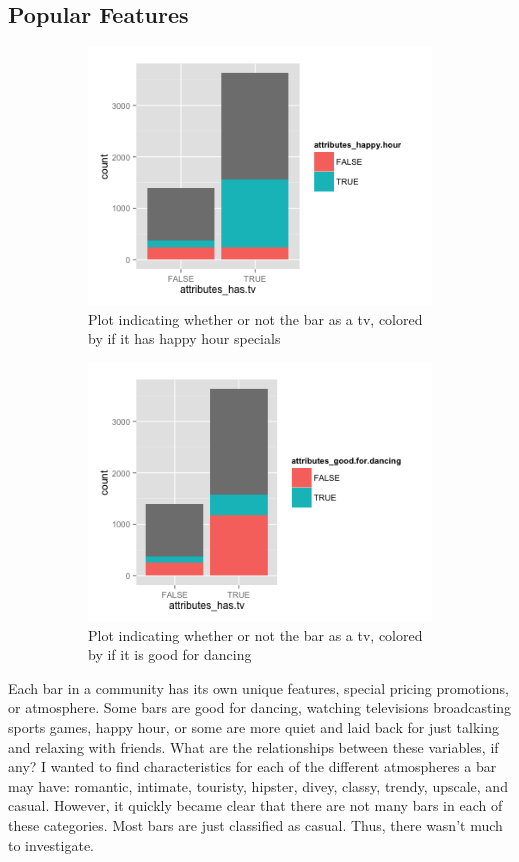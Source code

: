 \documentclass[11pt]{article}
\begin{document}
\subsection{Popular Features}
\begin{figure}
\centering
\begin{subfigure}{.5\textwidth}
  \centering
  \includegraphics[width=.4\linewidth]{Figures/tvhappyhour.png}
  \caption{Plot indicating whether or not the bar as a tv, colored by if it has happy hour specials}
  \label{happy}
\end{subfigure}%
\begin{subfigure}{.5\textwidth}
  \centering
  \includegraphics[width=.4\linewidth]{Figures/tvdancing.png}
  \caption{Plot indicating whether or not the bar as a tv, colored by if it is good for dancing}
  \label{dance}
\end{subfigure}
\caption{}
\label{}
\end{figure}
Each bar in a community has its own unique features, special pricing promotions, or atmosphere.  Some bars are good for dancing, watching televisions broadcasting sports games, happy hour, or some are more quiet and laid back for just talking and relaxing with friends.  What are the relationships between these variables, if any?  I wanted to find characteristics for each of the  different atmospheres a bar may have: romantic, intimate, touristy, hipster, divey, classy, trendy, upscale, and casual.  However, it quickly became clear that there are not many bars in each of these categories.  Most bars are just classified as casual.  Thus, there wasn't much to investigate.
\end{document}
